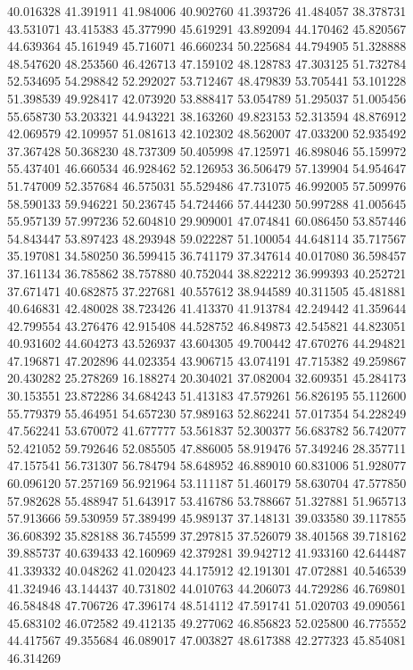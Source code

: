 40.016328
41.391911
41.984006
40.902760
41.393726
41.484057
38.378731
43.531071
43.415383
45.377990
45.619291
43.892094
44.170462
45.820567
44.639364
45.161949
45.716071
46.660234
50.225684
44.794905
51.328888
48.547620
48.253560
46.426713
47.159102
48.128783
47.303125
51.732784
52.534695
54.298842
52.292027
53.712467
48.479839
53.705441
53.101228
51.398539
49.928417
42.073920
53.888417
53.054789
51.295037
51.005456
55.658730
53.203321
44.943221
38.163260
49.823153
52.313594
48.876912
42.069579
42.109957
51.081613
42.102302
48.562007
47.033200
52.935492
37.367428
50.368230
48.737309
50.405998
47.125971
46.898046
55.159972
55.437401
46.660534
46.928462
52.126953
36.506479
57.139904
54.954647
51.747009
52.357684
46.575031
55.529486
47.731075
46.992005
57.509976
58.590133
59.946221
50.236745
54.724466
57.444230
50.997288
41.005645
55.957139
57.997236
52.604810
29.909001
47.074841
60.086450
53.857446
54.843447
53.897423
48.293948
59.022287
51.100054
44.648114
35.717567
35.197081
34.580250
36.599415
36.741179
37.347614
40.017080
36.598457
37.161134
36.785862
38.757880
40.752044
38.822212
36.999393
40.252721
37.671471
40.682875
37.227681
40.557612
38.944589
40.311505
45.481881
40.646831
42.480028
38.723426
41.413370
41.913784
42.249442
41.359644
42.799554
43.276476
42.915408
44.528752
46.849873
42.545821
44.823051
40.931602
44.604273
43.526937
43.604305
49.700442
47.670276
44.294821
47.196871
47.202896
44.023354
43.906715
43.074191
47.715382
49.259867
20.430282
25.278269
16.188274
20.304021
37.082004
32.609351
45.284173
30.153551
23.872286
34.684243
51.413183
47.579261
56.826195
55.112600
55.779379
55.464951
54.657230
57.989163
52.862241
57.017354
54.228249
47.562241
53.670072
41.677777
53.561837
52.300377
56.683782
56.742077
52.421052
59.792646
52.085505
47.886005
58.919476
57.349246
28.357711
47.157541
56.731307
56.784794
58.648952
46.889010
60.831006
51.928077
60.096120
57.257169
56.921964
53.111187
51.460179
58.630704
47.577850
57.982628
55.488947
51.643917
53.416786
53.788667
51.327881
51.965713
57.913666
59.530959
57.389499
45.989137
37.148131
39.033580
39.117855
36.608392
35.828188
36.745599
37.297815
37.526079
38.401568
39.718162
39.885737
40.639433
42.160969
42.379281
39.942712
41.933160
42.644487
41.339332
40.048262
41.020423
44.175912
42.191301
47.072881
40.546539
41.324946
43.144437
40.731802
44.010763
44.206073
44.729286
46.769801
46.584848
47.706726
47.396174
48.514112
47.591741
51.020703
49.090561
45.683102
46.072582
49.412135
49.277062
46.856823
52.025800
46.775552
44.417567
49.355684
46.089017
47.003827
48.617388
42.277323
45.854081
46.314269
